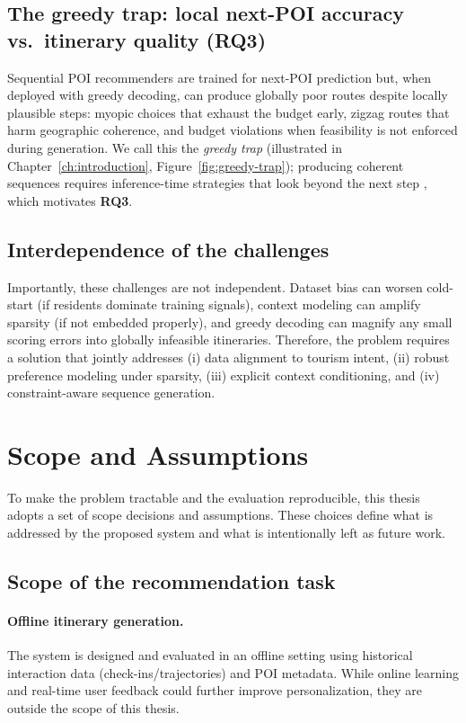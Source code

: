 \subsection{The greedy trap: local next-POI accuracy vs.\ itinerary quality (\textbf{RQ3})}
Sequential POI recommenders are trained for next-POI prediction but, when deployed with greedy decoding, can produce globally poor routes despite locally plausible steps: myopic choices that exhaust the budget early, zigzag routes that harm geographic coherence, and budget violations when feasibility is not enforced during generation. We call this the \emph{greedy trap} (illustrated in Chapter~\ref{ch:introduction}, Figure~\ref{fig:greedy-trap}); producing coherent sequences requires inference-time strategies that look beyond the next step \citep{wu2025tlmr}, which motivates \textbf{RQ3}.

\subsection{Interdependence of the challenges}
Importantly, these challenges are not independent. Dataset bias can worsen cold-start (if residents dominate training signals), context modeling can amplify sparsity (if not embedded properly), and greedy decoding can magnify any small scoring errors into globally infeasible itineraries. Therefore, the problem requires a solution that jointly addresses (i) data alignment to tourism intent, (ii) robust preference modeling under sparsity, (iii) explicit context conditioning, and (iv) constraint-aware sequence generation.

\section{Scope and Assumptions}
\label{sec:prob-scope}

To make the problem tractable and the evaluation reproducible, this thesis adopts a set of scope decisions and assumptions. These choices define what is addressed by the proposed system and what is intentionally left as future work.

\subsection{Scope of the recommendation task}
\paragraph{Offline itinerary generation.}
The system is designed and evaluated in an offline setting using historical interaction data (check-ins/trajectories) and POI metadata. While online learning and real-time user feedback could further improve personalization, they are outside the scope of this thesis.


